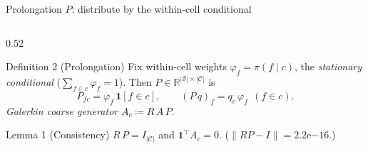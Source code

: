 \documentclass[10pt,aspectratio=169]{beamer}
\newcommand{\Sset}{\mathcal{S}}
\begin{document}
\begin{frame}{Prolongation $P$: distribute by the within-cell conditional}

  \begin{columns}[T]
    \begin{column}{0.52\textwidth}
      \begin{block}{Definition 2 (Prolongation)}\small
        Fix within-cell weights $\varphi_f=\pi(f\mid c)$, the \emph{stationary
        conditional} ($\sum_{f\in c}\varphi_f=1$). Then
        $P\in\mathbb R^{|\Sset|\times|\mathcal C|}$ is
        \[
          P_{fc}=\varphi_f\,\mathbf 1[f\in c],\qquad
          (P\,q)_f=q_c\,\varphi_f\ \ (f\in c).
        \]
        \emph{Galerkin coarse generator} $A_c\coloneqq R\,A\,P$.
      \end{block}

      \begin{block}{Lemma 1 (Consistency)}\small
        $R\,P=I_{|\mathcal C|}$ and $\mathbf 1^\top A_c=0$. ($\|RP-I\|=2.2\mathrm{e}{-16}$.)
      \end{block}


\end{column}
\end{columns}
\end{frame}
\end{document}
